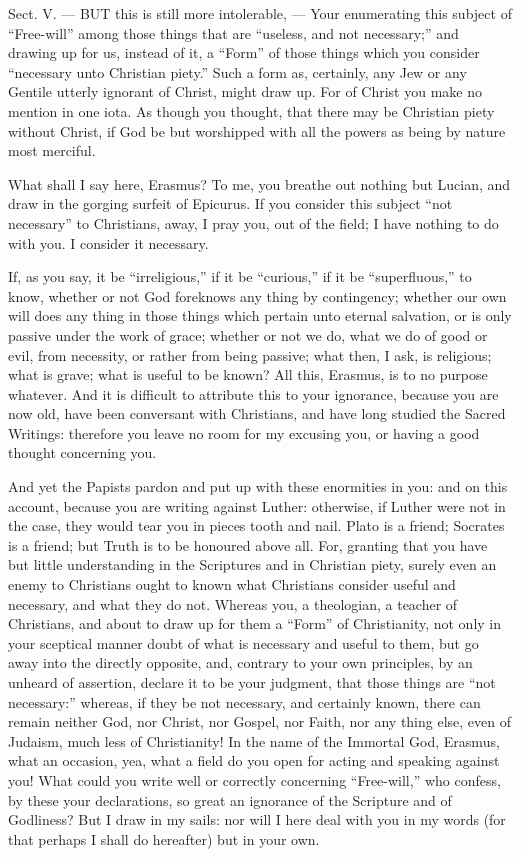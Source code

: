 
Sect. V. — BUT this is still more intolerable, — Your enumerating this subject of “Free-will” among those things that are “useless, and not necessary;” and drawing up for us, instead of it, a “Form” of those things which you consider “necessary unto Christian piety.” Such a form as, certainly, any Jew or any Gentile utterly ignorant of Christ, might draw up. For of Christ you make no mention in one iota. As though you thought, that there may be Christian piety without Christ, if God be but worshipped with all the powers as being by nature most merciful.

What shall I say here, Erasmus? To me, you breathe out nothing but Lucian, and draw in the gorging surfeit of Epicurus. If you consider this subject “not necessary” to Christians, away, I pray you, out of the field; I have nothing to do with you. I consider it necessary.

If, as you say, it be “irreligious,” if it be “curious,” if it be “superfluous,” to know, whether or not God foreknows any thing by contingency; whether our own will does any thing in those things which pertain unto eternal salvation, or is only passive under the work of grace; whether or not we do, what we do of good or evil, from necessity, or rather from being passive; what then, I ask, is religious; what is grave; what is useful to be known? All this, Erasmus, is to no purpose whatever. And it is difficult to attribute this to your ignorance, because you are now old, have been conversant with Christians, and have long studied the Sacred Writings: therefore you leave no room for my excusing you, or having a good thought concerning you.

And yet the Papists pardon and put up with these enormities in you: and on this account, because you are writing against Luther: otherwise, if Luther were not in the case, they would tear you in pieces tooth and nail. Plato is a friend; Socrates is a friend; but Truth is to be honoured above all. For, granting that you have but little understanding in the Scriptures and in Christian piety, surely even an enemy to Christians ought to known what Christians consider useful and necessary, and what they do not. Whereas you, a theologian, a teacher of Christians, and about to draw up for them a “Form” of Christianity, not only in your sceptical manner doubt of what is necessary and useful to them, but go away into the directly opposite, and, contrary to your own principles, by an unheard of assertion, declare it to be your judgment, that those things are “not necessary:” whereas, if they be not necessary, and certainly known, there can remain neither God, nor Christ, nor Gospel, nor Faith, nor any thing else, even of Judaism, much less of Christianity! In the name of the Immortal God, Erasmus, what an occasion, yea, what a field do you open for acting and speaking against you! What could you write well or correctly concerning “Free-will,” who confess, by these your declarations, so great an ignorance of the Scripture and of Godliness? But I draw in my sails: nor will I here deal with you in my words (for that perhaps I shall do hereafter) but in your own.

